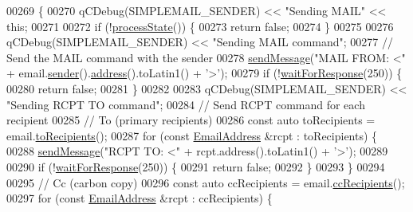 \begin{DoxyCode}
00269 \{
00270     qCDebug(SIMPLEMAIL\_SENDER) << \textcolor{stringliteral}{"Sending MAIL"} << \textcolor{keyword}{this};
00271 
00272     \textcolor{keywordflow}{if} (!\hyperlink{class_simple_mail_1_1_sender_private_ab3a7663dd6945ce2ba074d37cfc4e4ec}{processState}()) \{
00273         \textcolor{keywordflow}{return} \textcolor{keyword}{false};
00274     \}
00275 
00276     qCDebug(SIMPLEMAIL\_SENDER) << \textcolor{stringliteral}{"Sending MAIL command"};
00277     \textcolor{comment}{// Send the MAIL command with the sender}
00278     \hyperlink{class_simple_mail_1_1_sender_private_a01805bb24291bf6cad3a656a16d0bb25}{sendMessage}(\textcolor{stringliteral}{"MAIL FROM: <"} + email.\hyperlink{class_simple_mail_1_1_mime_message_a626953414e4eed9e57ea793eb60a2d6b}{sender}().\hyperlink{class_simple_mail_1_1_email_address_a426faf41f9f1c56014a97eec4d37ba4a}{address}().toLatin1() + \textcolor{charliteral}{'>'});
00279     \textcolor{keywordflow}{if} (!\hyperlink{class_simple_mail_1_1_sender_private_af8ba23dc3e1201d303ad1d923235c71c}{waitForResponse}(250)) \{
00280         \textcolor{keywordflow}{return} \textcolor{keyword}{false};
00281     \}
00282 
00283     qCDebug(SIMPLEMAIL\_SENDER) << \textcolor{stringliteral}{"Sending RCPT TO command"};
00284     \textcolor{comment}{// Send RCPT command for each recipient}
00285     \textcolor{comment}{// To (primary recipients)}
00286     \textcolor{keyword}{const} \textcolor{keyword}{auto} toRecipients = email.\hyperlink{class_simple_mail_1_1_mime_message_a1e3c4cf44d48b95f8436d251d19ffcb2}{toRecipients}();
00287     \textcolor{keywordflow}{for} (\textcolor{keyword}{const} \hyperlink{class_simple_mail_1_1_email_address}{EmailAddress} &rcpt : toRecipients) \{
00288         \hyperlink{class_simple_mail_1_1_sender_private_a01805bb24291bf6cad3a656a16d0bb25}{sendMessage}(\textcolor{stringliteral}{"RCPT TO: <"} + rcpt.address().toLatin1() + \textcolor{charliteral}{'>'});
00289 
00290         \textcolor{keywordflow}{if} (!\hyperlink{class_simple_mail_1_1_sender_private_af8ba23dc3e1201d303ad1d923235c71c}{waitForResponse}(250)) \{
00291             \textcolor{keywordflow}{return} \textcolor{keyword}{false};
00292         \}
00293     \}
00294 
00295     \textcolor{comment}{// Cc (carbon copy)}
00296     \textcolor{keyword}{const} \textcolor{keyword}{auto} ccRecipients = email.\hyperlink{class_simple_mail_1_1_mime_message_a69cf7d797c2405f31f50c6959c00a12f}{ccRecipients}();
00297     \textcolor{keywordflow}{for} (\textcolor{keyword}{const} \hyperlink{class_simple_mail_1_1_email_address}{EmailAddress} &rcpt : ccRecipients) \{

\end{DoxyCode}
